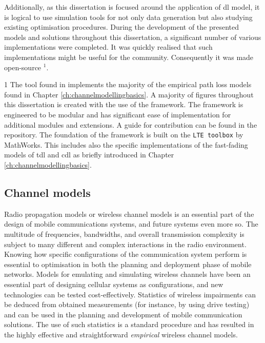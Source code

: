 Additionally, as this dissertation is focused around the application of \gls{dl} model, it is logical to use simulation tools for not only data generation but also studying existing optimisation procedures. During the development of the presented models and solutions throughout this dissertation, a significant number of various implementations were completed. It was quickly realised that such implementations might be useful for the community. Consequently it was made open-source \cite{monster}$^1$.
\begin{marginfigure}
1 The tool found in \cite{monster} implements the majority of the empirical path loss models found in Chapter \ref{ch:channelmodellingbasics}. A majority of figures throughout this dissertation is created with the use of the framework. The framework is engineered to be modular and has significant ease of implementation for additional modules and extensions. A guide for contribution can be found in the repository. The foundation of the framework is built on the \texttt{LTE toolbox} by MathWorks. This includes also the specific implementations of the fast-fading models of \gls{tdl} and \gls{cdl} as briefly introduced in Chapter \ref{ch:channelmodellingbasics}.
\end{marginfigure}


\subsection{Channel models}

Radio propagation models or wireless channel models is an essential part of the design of mobile communications systems, and future systems even more so. The multitude of frequencies, bandwidths, and overall transmission complexity is subject to many different and complex interactions in the radio environment. Knowing how specific configurations of the communication system perform is essential to optimisation in both the planning and deployment phase of mobile networks. Models for emulating and simulating wireless channels have been an essential part of designing cellular systems as configurations, and new technologies can be tested cost-effectively. Statistics of wireless impairments can be deduced from obtained measurements (for instance, by using drive testing) and can be used in the planning and development of mobile communication solutions. The use of such statistics is a standard procedure and has resulted in the highly effective and straightforward \emph{empirical} wireless channel models. 


